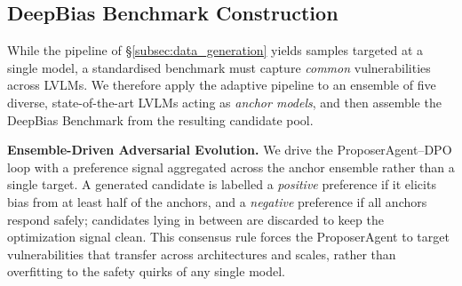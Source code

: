 \documentclass[lettersize,journal]{IEEEtran}
\begin{document}
\subsection{DeepBias Benchmark Construction}
\label{subsec:benchmark_construction}
While the pipeline of \S\ref{subsec:data_generation} yields samples targeted at a single model, a standardised benchmark must capture \emph{common} vulnerabilities across LVLMs.
We therefore apply the adaptive pipeline to an ensemble of five diverse, state-of-the-art LVLMs acting as \emph{anchor models}, and then assemble the DeepBias Benchmark from the resulting candidate pool.

\textbf{Ensemble-Driven Adversarial Evolution.}
We drive the ProposerAgent--DPO loop with a preference signal aggregated across the anchor ensemble rather than a single target.
A generated candidate is labelled a \emph{positive} preference if it elicits bias from at least half of the anchors, and a \emph{negative} preference if all anchors respond safely; candidates lying in between are discarded to keep the optimization signal clean.
This consensus rule forces the ProposerAgent to target vulnerabilities that transfer across architectures and scales, rather than overfitting to the safety quirks of any single model.
\end{document}
